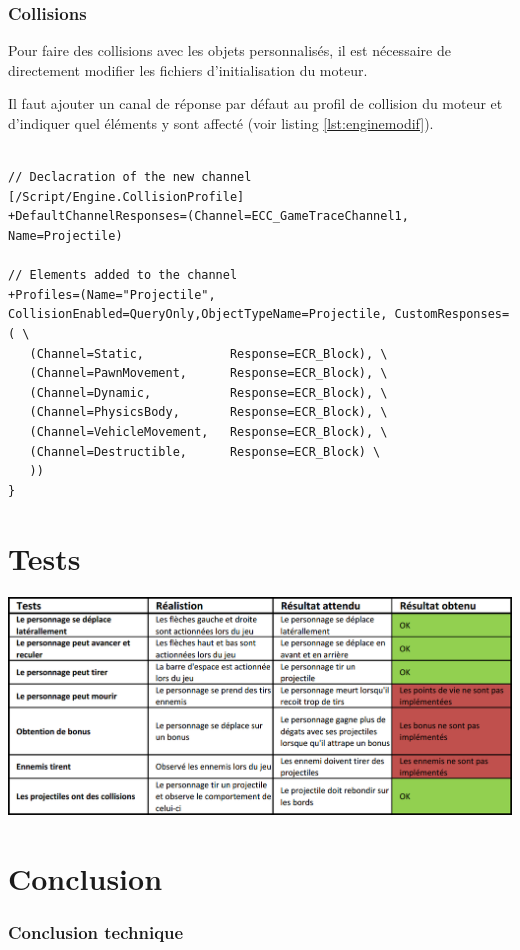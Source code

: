 \documentclass[11pt, a4paper, oneside]{article}
\begin{document}
\section{Collisions}
Pour faire des collisions avec les objets personnalisés, il est nécessaire de directement modifier les fichiers d'initialisation du moteur.

Il faut ajouter un canal de réponse par défaut au profil de collision du moteur et d'indiquer quel éléments y sont affecté (voir listing \ref{lst:enginemodif}).

\begin{lstlisting}[frame=single, caption={Paramètres a ajouter au moteur par défaut}, captionpos=b, label=lst:enginemodif]  % Start your code-block

// Declacration of the new channel
[/Script/Engine.CollisionProfile]
+DefaultChannelResponses=(Channel=ECC_GameTraceChannel1, Name=Projectile)

// Elements added to the channel
+Profiles=(Name="Projectile", CollisionEnabled=QueryOnly,ObjectTypeName=Projectile, CustomResponses=( \
   (Channel=Static,            Response=ECR_Block), \
   (Channel=PawnMovement,      Response=ECR_Block), \
   (Channel=Dynamic,           Response=ECR_Block), \
   (Channel=PhysicsBody,       Response=ECR_Block), \
   (Channel=VehicleMovement,   Response=ECR_Block), \
   (Channel=Destructible,      Response=ECR_Block) \
   ))
}
\end{lstlisting}
\newpage
\part{Tests}
\begin{center}
	\includegraphics[width=\textwidth]{tests}
\end{center}
\newpage
\part{Conclusion}
\section{Conclusion technique}
\end{document}
